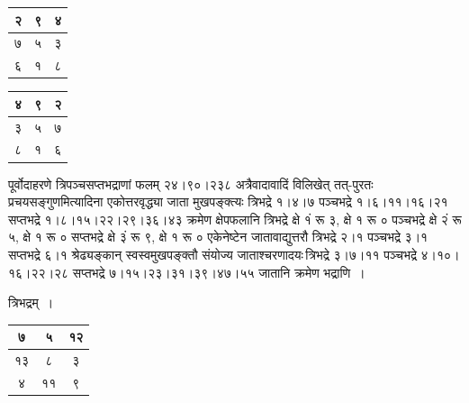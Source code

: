\documentclass[11pt, openany]{book}
\begin{document}
\begin{table}[h]
\begin{tabular}{|c|c|c|}
	\hline
	२ & ९ & ४\\
	\hline
	७ & ५ & ३\\
	\hline
	६ & १ & ८\\
	\hline
\end{tabular}
\hspace{2mm}
\begin{tabular}{|c|c|c|}
	\hline
	४ & ९ & २\\
	\hline
	३ & ५ & ७\\
	\hline
	८ & १ & ६\\
	\hline
\end{tabular}
\end{table}

पूर्वोदाहरणे त्रिपञ्चसप्तभद्राणां फलम् २४।९०।२३८ अत्रैवादावादिं विलिखेत् तत्-पुरतः प्रचयसङ्गुणमित्यादिना एकोत्तरवृद्ध्या जाता मुखपङ्क्त्यः त्रिभद्रे १।४।७ पञ्चभद्रे १।६।११।१६।२१ सप्तभद्रे १।८।१५।२२।२९।३६।४३ क्रमेण क्षेपफलानि त्रिभद्रे क्षे १ं रू ३, क्षे १ रू ० पञ्चभद्रे क्षे २ं रू ५, क्षे १ रू ० सप्तभद्रे क्षे ३ं रू ९, क्षे १ रू ० एकेनेष्टेन जातावाद्युत्तरौ त्रिभद्रे २।१ पञ्चभद्रे ३।१ सप्तभद्रे ६।१ श्रेढ्यङ्कान् स्वस्वमुखपङ्क्तौ संयोज्य जाताश्चरणादयः\textendash \,त्रिभद्रे ३।७।११ पञ्चभद्रे ४।१०।१६।२२।२८ सप्तभद्रे ७।१५।२३।३१।३९।४७।५५ जातानि क्रमेण भद्राणि~।

\begin{center}
त्रिभद्रम्~।\\
\vspace{2mm}
	
\begin{tabular}{|c|c|c|}
	\hline
	७ & ५ & १२\\
	\hline
	१३ & ८ & ३\\
	\hline
	४ & ११ & ९\\
	\hline
\end{tabular}
\end{center}

\newpage
\end{document}
